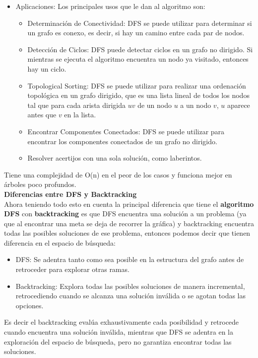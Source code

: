 \begin{itemize}
    \item Aplicaciones: Los principales usos que le dan al algoritmo son:
    \begin{itemize}
        \item Determinación de Conectividad: DFS se puede utilizar para determinar si un grafo es 
        conexo, es decir, si hay un camino entre cada par de nodos.

        \item Detección de Ciclos: DFS puede detectar ciclos en un grafo no dirigido. Si mientras 
        se ejecuta el algoritmo encuentra un nodo ya visitado, entonces hay un ciclo.

        \item Topological Sorting: DFS se puede utilizar para realizar una ordenación topológica 
        en un grafo dirigido, que es una lista lineal de todos los nodos tal que para cada arista 
        dirigida $uv$ de un nodo $u$ a un nodo $v$, $u$ aparece antes que $v$ en la lista.

        \item Encontrar Componentes Conectados: DFS se puede utilizar para encontrar los componentes 
        conectados de un grafo no dirigido.

        \item Resolver acertijos con una sola solución, como laberintos.
    \end{itemize}

\end{itemize}


Tiene una complejidad de O(n) en el peor de los casos y funciona mejor en árboles poco profundos.\\

\textbf{\large{Diferencias entre DFS y Backtracking}} \\

Ahora teniendo todo esto en cuenta la principal diferencia que tiene el \textbf{algoritmo DFS} 
con \textbf{backtracking} es que DFS encuentra una solución a un problema (ya que al encontrar una 
meta se deja de recorrer la gráfica) y backtracking encuentra todas las posibles soluciones de ese 
problema, entonces podemos decir que tienen diferencia en el espacio de búsqueda:\\

\begin{itemize}
    \item DFS: Se adentra tanto como sea posible en la estructura del grafo antes de retroceder 
    para explorar otras ramas.

    \item Backtracking: Explora todas las posibles soluciones de manera incremental, retrocediendo 
    cuando se alcanza una solución inválida o se agotan todas las opciones.
\end{itemize}

Es decir el backtracking evalúa exhaustivamente cada posibilidad y retrocede cuando encuentra una solución inválida, mientras que DFS se adentra en la exploración del espacio de búsqueda, pero no garantiza encontrar todas las soluciones.

